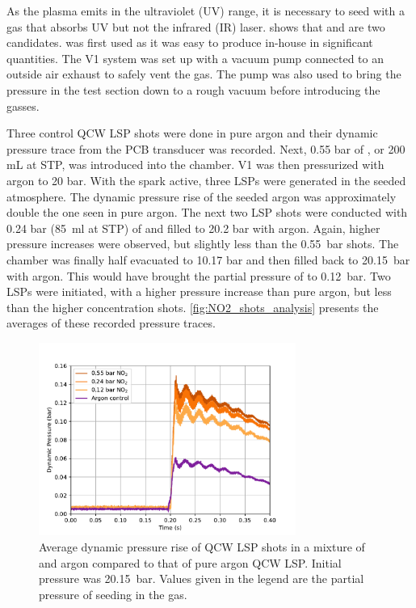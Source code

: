             As the plasma emits in the ultraviolet (UV) range, it is necessary to seed with a gas that absorbs UV but not the infrared (IR) laser. \textcite{khanGasDetectionUsing2019} shows that  and  are two candidates.  was first used as it was easy to produce in-house in significant quantities. The V1 system was set up with a vacuum pump connected to an outside air exhaust to safely vent the  gas. The pump was also used to bring the pressure in the test section down to a rough vacuum before introducing the gasses.


            Three control QCW LSP shots were done in pure argon and their dynamic pressure trace from the PCB transducer was recorded. Next, 0.55 bar of , or 200 mL at STP, was introduced into the chamber. V1 was then pressurized with argon to 20 bar. With the spark active, three LSPs were generated in the seeded atmosphere. The dynamic pressure rise of the seeded argon was approximately double the one seen in pure argon. The next two LSP shots were conducted with 0.24 bar (\qty{85}{ml} at STP) of  and filled to 20.2 bar with argon. Again, higher pressure increases were observed, but slightly less than the \qty{0.55}{bar} shots. The chamber was finally half evacuated to 10.17 bar and then filled back to \qty{20.15}{bar} with argon. This would have brought the partial pressure of  to \qty{0.12}{bar}. Two LSPs were initiated, with a higher pressure increase than pure argon, but less than the higher concentration  shots. \autoref{fig:NO2_shots_analysis} presents the averages of these recorded pressure traces.

            \begin{figure}[!ht]
                \centering
                \includegraphics[width=0.75\textwidth]{assets/4 experiments/NO2_shots_analysis.pdf}
                \caption{Average dynamic pressure rise of QCW LSP shots in a mixture of  and argon compared to that of pure argon QCW LSP. Initial pressure was \qty{20.15}{bar}. Values given in the legend are the partial pressure of  seeding in the gas.}
                \label{fig:NO2_shots_analysis}
            \end{figure}

